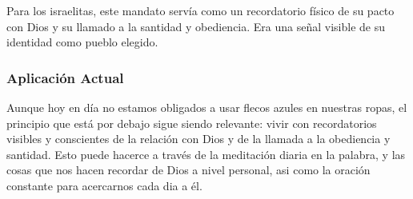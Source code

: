\begin{multicols}{2}
Para los israelitas, este mandato servía como un recordatorio físico de su pacto con Dios y su llamado a la santidad y obediencia. Era una señal visible de su identidad como pueblo elegido.

\subsubsection{Aplicación Actual}

Aunque hoy en día no estamos obligados a usar flecos azules en nuestras ropas, el principio que está por debajo sigue siendo relevante: vivir con recordatorios visibles y conscientes de la relación con Dios y de la llamada a la obediencia y santidad.
Esto puede hacerce a través de la meditación diaria en la palabra, y las cosas que nos hacen recordar de Dios a nivel personal, asi como la oración constante para acercarnos cada dia a él.

\end{multicols}
